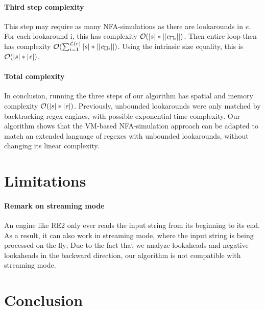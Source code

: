 \documentclass{article}
\def\size#1{\ensuremath{|#1|}}
\def\psize#1{\ensuremath{||#1||}}
\def\looknb#1{\ensuremath{\mathcal{L}(#1)}}
\def\bigo{\ensuremath{\mathcal{O}}}
\begin{document}
\paragraph{Third step complexity}
This step may require as many NFA-simulations as there are lookarounds in $e$.
For each lookaround i, this has complexity $\bigo(\size{s} * \psize{\re_{\Box i}})$.
Then entire loop then has complexity $\bigo(\sum_{i=1}^{\looknb{r}} \size{s} * \psize{\re_{\Box i}})$.
Using the intrinsic size equality, this is $\bigo(\size{s} * \size{\re})$.

\paragraph{Total complexity}
In conclusion, running the three steps of our algorithm has spatial and memory complexity $\bigo(\size{s} * \size{\re})$.
Previously, unbounded lookarounds were only matched by backtracking regex engines, with possible exponential time complexity.
Our algorithm shows that the VM-based NFA-simulation approach can be adapted to match an extended language of regexes with unbounded lookarounds, without changing its linear complexity.

\section{Limitations}

\paragraph{Remark on streaming mode}
An engine like RE2 only ever reads the input string from its beginning to its end.
As a result, it can also work in streaming mode, where the input string is being processed on-the-fly;
Due to the fact that we analyze lookaheads and negative lookaheads in the backward direction, our algorithm is not compatible with streaming mode.

\section{Conclusion}



\newpage

\end{document}
